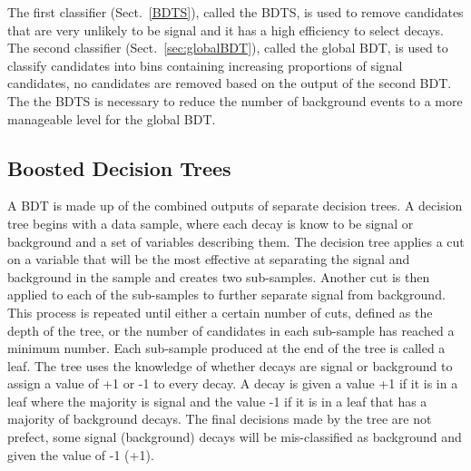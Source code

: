 The first classifier (Sect.~\ref{BDTS}), called the BDTS, is used to remove candidates that are very unlikely to be signal and it has a high efficiency to select \bmumu decays. The second classifier (Sect.~\ref{sec:globalBDT}), called the global BDT, is used to classify candidates into bins containing increasing proportions of signal candidates, no candidates are removed based on the output of the second BDT. The the BDTS is necessary to reduce the number of background events to a more manageable level for the global BDT.

\subsection{Boosted Decision Trees}
\label{sec:GeneralBDT}
A BDT is made up of the combined outputs of separate decision trees. A decision tree begins with a data sample, where each decay is know to be signal or background and a set of variables describing them. The decision tree applies a cut on a variable that will be the most effective at separating the signal and background in the sample and creates two sub-samples. Another cut is then applied to each of the sub-samples to further separate signal from background. This process is repeated until either a certain number of cuts, defined as the depth of the tree, or the number of candidates in each sub-sample has reached a minimum number. Each sub-sample produced at the end of the tree is called a leaf. The tree uses the knowledge of whether decays are signal or background to assign a value of +1 or -1 to every decay. A decay is given a value +1 if it is in a leaf where the majority is signal and the value -1 if it is in a leaf that has a majority of background decays. The final decisions made by the tree are not prefect, some signal (background) decays will be mis-classified as background and given the value of -1 (+1). %

